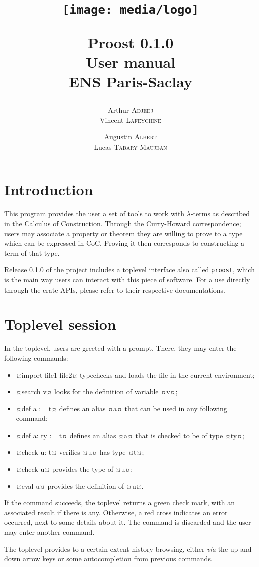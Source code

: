 \documentclass[twocolumn]{article}
\author{
  Arthur \textsc{Adjedj}\\
  Vincent \textsc{Lafeychine} \and
  Augustin \textsc{Albert} \\
  Lucas \textsc{Tabary-Maujean}
}
\title{
  \texttt{[image: media/logo]}

	\textbf{Proost 0.1.0} \\
	User manual
  \\[1\baselineskip]\normalsize ENS Paris-Saclay
}
\begin{document}
\maketitle
\thispagestyle{fancy}

\section{Introduction}
This program provides the user a set of tools to work with \(\lambda\)-terms as
described in the Calculus of Construction. Through the Curry-Howard
correspondence; users may associate a property or theorem they are willing to
prove to a type which can be expressed in CoC. Proving it then corresponds to
constructing a term of that type.

Release 0.1.0 of the project includes a toplevel interface also called
\texttt{proost}, which is the main way users can interact with this piece of
software. For a use directly through the crate APIs, please refer to their
respective documentations.

\section{Toplevel session}
In the toplevel, users are greeted with a prompt. There, they may enter the
following commands:
\begin{itemize}
	\item ¤import file1 file2¤ typechecks
		and loads the file in the current environment;
	\item ¤search v¤ looks for the definition of variable ¤v¤;
	\item ¤def a := t¤
		defines an alias ¤a¤ that can be used in any following command;
	\item ¤def a: ty := t¤ defines an alias ¤a¤ that is checked to
		be of type ¤ty¤;
	\item ¤check u: t¤ verifies ¤u¤ has type ¤t¤;
  \item ¤check u¤ provides the type of ¤u¤;
  \item ¤eval u¤ provides the definition of ¤u¤.
\end{itemize}

If the command succeeds, the toplevel returns a green check mark, with an
associated result if there is any. Otherwise, a red cross indicates an error
occurred, next to some details about it. The command is discarded and the user
may enter another command.

The toplevel provides to a certain extent history browsing, either \emph{via}
the up and down arrow keys or some autocompletion from previous commands.
\end{document}
